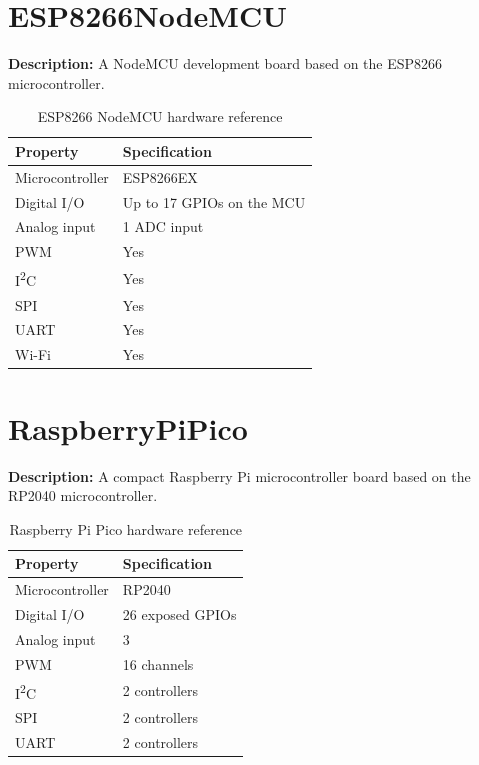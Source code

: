 \section{ESP8266NodeMCU}

\textbf{Description:} A NodeMCU development board based on the ESP8266
microcontroller.

\begin{table}[H]
\centering
\caption{ESP8266 NodeMCU hardware reference}
\label{tab:board-esp8266-nodemcu}
\begin{tabular}{ll}
\toprule
\textbf{Property} & \textbf{Specification} \\
\midrule
Microcontroller & ESP8266EX \\
Digital I/O & Up to 17 GPIOs on the MCU \\
Analog input & 1 ADC input \\
PWM & Yes \\
I\textsuperscript{2}C & Yes \\
SPI & Yes \\
UART & Yes \\
Wi-Fi & Yes \\
\bottomrule
\end{tabular}
\end{table}

\section{RaspberryPiPico}

\textbf{Description:} A compact Raspberry Pi microcontroller board based
on the RP2040 microcontroller.

\begin{table}[H]
\centering
\caption{Raspberry Pi Pico hardware reference}
\label{tab:board-pico}
\begin{tabular}{ll}
\toprule
\textbf{Property} & \textbf{Specification} \\
\midrule
Microcontroller & RP2040 \\
Digital I/O & 26 exposed GPIOs \\
Analog input & 3 \\
PWM & 16 channels \\
I\textsuperscript{2}C & 2 controllers \\
SPI & 2 controllers \\
UART & 2 controllers \\
\bottomrule
\end{tabular}
\end{table}

